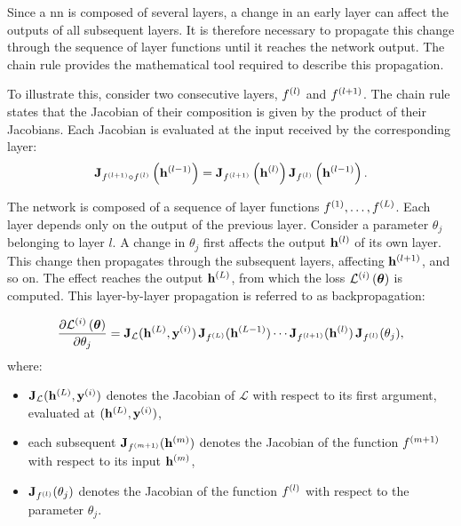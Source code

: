 Since a \gls{nn} is composed of several layers, a change in an early layer can affect the outputs of all subsequent layers.
It is therefore necessary to propagate this change through the sequence of layer functions until it reaches the network output.
The chain rule provides the mathematical tool required to describe this propagation.

To illustrate this, consider two consecutive layers, $f^{(l)}$ and $f^{(l+1)}$.
The chain rule states that the Jacobian of their composition is given by the product of their Jacobians.
Each Jacobian is evaluated at the input received by the corresponding layer:
\begin{equation}
\mat{J}_{\LayerFunction{l+1} \circ \LayerFunction{l}}\left(\latentRepresentation[l-1]\right)
=
\mat{J}_{\LayerFunction{l+1}}\left(\latentRepresentation[l]\right)
\mat{J}_{\LayerFunction{l}}\left(\latentRepresentation[l-1]\right).
\label{eq:chain_rule_generic}
\end{equation}


The network is composed of a sequence of layer functions $f^{(1)}, \dots, f^{(L)}$.
Each layer depends only on the output of the previous layer.
Consider a parameter $\theta_j$ belonging to layer $l$.
A change in $\theta_j$ first affects the output $\latentRepresentation[l]$ of its own layer.
This change then propagates through the subsequent layers, affecting $\latentRepresentation[l+1]$, and so on.
The effect reaches the output $\latentRepresentation[L]$, from which the loss $\mathcal{L}^{(i)}\left(\boldsymbol{\theta}\right)$ is computed.
This layer-by-layer propagation is referred to as backpropagation:
\begin{equationwhere}
\begin{equation}
\frac{\partial \loss{\params}{i}}{\partial \theta_j}
=
\mat{J}_{\mathcal{L}}(\latentRepresentation[L], \vect{y}^{(i)})
\, \mat{J}_{\LayerFunction{L}}(\latentRepresentation[L-1])
\cdots
\mat{J}_{\LayerFunction{l+1}}(\latentRepresentation[l])
\, \mat{J}_{\LayerFunction{l}}(\theta_j),
\label{eq:chain_rule}
\end{equation}
where:
\begin{itemize}
\item $\mat{J}_{\mathcal{L}}(\latentRepresentation[L], \vect{y}^{(i)})$ denotes the Jacobian of $\mathcal{L}$ with respect to its first argument, evaluated at $(\latentRepresentation[L], \vect{y}^{(i)})$,
\item each subsequent $\mat{J}_{\LayerFunction{m+1}}(\latentRepresentation[m])$ denotes the Jacobian of the function $f^{(m+1)}$ with respect to its input $\latentRepresentation[m]$,
\item $\mathbf{J}_{f^{(l)}}(\theta_j)$ denotes the Jacobian of the function $f^{(l)}$ with respect to the parameter $\theta_j$.
\end{itemize}
\end{equationwhere}

